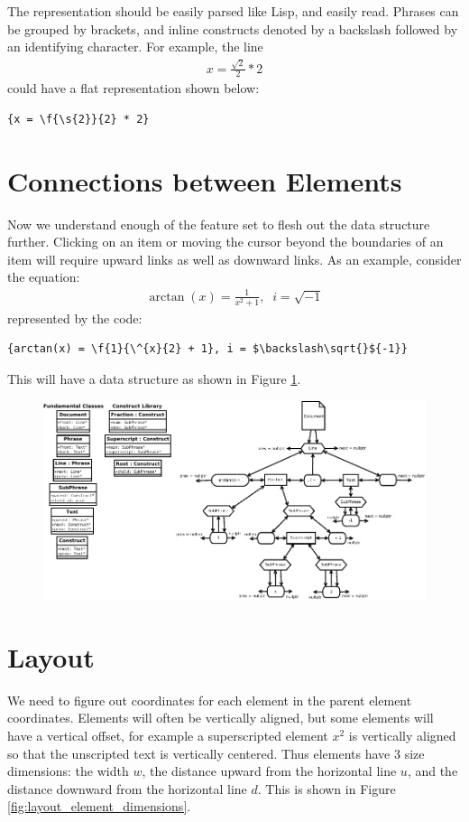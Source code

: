 \documentclass[12pt]{article}
\begin{document}
The representation should be easily parsed like Lisp, and easily read. Phrases can be grouped by brackets, and inline constructs denoted by a backslash followed by an identifying character. For example, the line
\begin{align*}
x = \frac{\sqrt{2}}{2} * 2
\end{align*}
could have a flat representation shown below:
\begin{lstlisting}[xleftmargin=.33\textwidth, xrightmargin=.33\textwidth]
{x = \f{\s{2}}{2} * 2}
\end{lstlisting}

\section{Connections between Elements}

Now we understand enough of the feature set to flesh out the data structure further. Clicking on an item or moving the cursor beyond the boundaries of an item will require upward links as well as downward links. As an example, consider the equation:
\begin{align*}
\arctan(x) = \frac{1}{x^2 + 1}, \;\; i = \sqrt{-1}
\end{align*}
represented by the code:
\begin{lstlisting}[xleftmargin=.15\textwidth, xrightmargin=.15\textwidth,mathescape=true]
{arctan(x) = \f{1}{\^{x}{2} + 1}, i = $\backslash\sqrt{}${-1}}
\end{lstlisting}
This will have a data structure as shown in Figure \ref{fig:connections}.

\begin{figure}[ht]
	\centering
		\includegraphics[width=1\textwidth]{Fig/Connections.pdf}
	\caption{}
	\label{fig:connections}
\end{figure}

\section{Layout}
We need to figure out coordinates for each element in the parent element coordinates. Elements will often be vertically aligned, but some elements will have a vertical offset, for example a superscripted element $x^2$ is vertically aligned so that the unscripted text is vertically centered. Thus elements have 3 size dimensions: the width $w$, the distance upward from the horizontal line $u$, and the distance downward from the horizontal line $d$. This is shown in Figure \ref{fig:layout_element_dimensions}.
\end{document}
